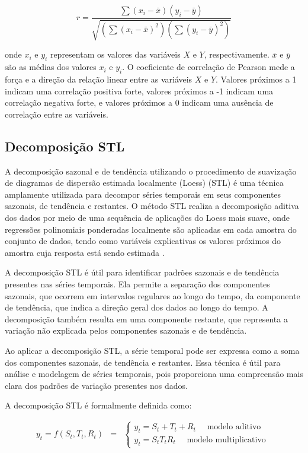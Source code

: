 \begin{equation}
	r=\frac{\sum\left(x_i-\bar{x}\right)\left(y_i-\bar{y}\right)}{\sqrt{\left(\sum\left(x_i-\bar{x}\right)^2\right)\left(\sum\left(y_i-\bar{y}\right)^2\right)}}
\end{equation}

\noindent onde $x_i$ e $y_i$ representam os valores das variáveis $X$ e $Y$, respectivamente. $\bar{x}$ e $\bar{y}$ são as médias dos valores $x_i$ e $y_i$. O coeficiente de correlação de Pearson mede a força e a direção da relação linear entre as variáveis $X$ e $Y$. Valores próximos a 1 indicam uma correlação positiva forte, valores próximos a -1 indicam uma correlação negativa forte, e valores próximos a 0 indicam uma ausência de correlação entre as variáveis.


\subsection{Decomposi\c c\~ao STL}

A decomposição sazonal e de tendência utilizando o procedimento de suavização de diagramas de dispersão estimada localmente (Loess) (STL) é uma técnica amplamente utilizada para decompor séries temporais em seus componentes sazonais, de tendência e restantes. O método STL realiza a decomposição aditiva dos dados por meio de uma sequência de aplicações do Loess mais suave, onde regressões polinomiais ponderadas localmente são aplicadas em cada amostra do conjunto de dados, tendo como variáveis explicativas os valores próximos do amostra cuja resposta está sendo estimada \cite{Theodosiou20111178}.

A decomposição STL é útil para identificar padrões sazonais e de tendência presentes nas séries temporais. Ela permite a separação dos componentes sazonais, que ocorrem em intervalos regulares ao longo do tempo, da componente de tendência, que indica a direção geral dos dados ao longo do tempo. A decomposição também resulta em uma componente restante, que representa a variação não explicada pelos componentes sazonais e de tendência.

Ao aplicar a decomposição STL, a série temporal pode ser expressa como a soma dos componentes sazonais, de tendência e restantes. Essa técnica é útil para análise e modelagem de séries temporais, pois proporciona uma compreensão mais clara dos padrões de variação presentes nos dados.

A decomposição STL é formalmente definida como:

\begin{eqnarray}
	y_t=f\left(S_t, T_t, R_t\right)&=&\left\{\begin{array}{l}
		y_t=S_t+T_t+R_t \quad \text { modelo aditivo } \\
		y_t=S_t T_t R_t \quad \text { modelo multiplicativo }
	\end{array}\right. \label{eq:stl}
\end{eqnarray}


